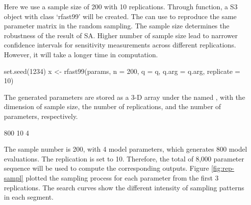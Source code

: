 Here we use a sample size of 200 with 10 replications. Through
 function, a S3 object with class `rfast99' will be
created. The  can use to reproduce the same parameter
matrix in the random sampling. The sample size determines the robustness
of the result of SA. Higher number of sample size lead to narrower
confidence intervals for sensitivity measurements across different
replications. However, it will take a longer time in computation.

\begin{Schunk}
\begin{Sinput}
set.seed(1234)
x <- rfast99(params, n = 200, q = q, q.arg = q.arg, replicate = 10)
\end{Sinput}
\end{Schunk}

The generated parameters are stored as a 3-D array under the named
, with the dimension of sample size, the number of replications,
and the number of parameters, respectively.

\begin{Schunk}
\begin{Soutput}
  [1] 800  10   4
\end{Soutput}
\end{Schunk}

The sample number is 200, with 4 model parameters, which generates 800
model evaluations. The replication is set to 10. Therefore, the total of
8,000 parameter sequence will be used to compute the corresponding
outputs. Figure \ref{fig:rep-sampl} plotted the sampling process for
each parameter from the first 3 replications. The search curves show the
different intensity of sampling patterns in each segment.

